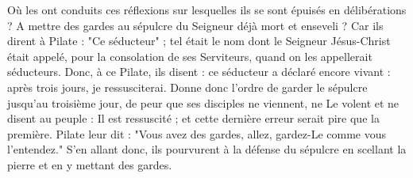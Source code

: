  Où les ont conduits ces réflexions sur lesquelles ils se sont épuisés en délibérations ? A mettre des gardes au sépulcre du Seigneur déjà mort et enseveli ? Car ils dirent à Pilate : "Ce séducteur" ; tel était le nom dont le Seigneur Jésus-Christ était appelé, pour la consolation de ses Serviteurs, quand on les appellerait séducteurs. Donc, à ce Pilate, ils disent : ce séducteur a déclaré encore vivant : après trois jours, je ressusciterai. Donne donc l'ordre de garder le sépulcre jusqu'au troisième jour, de peur que ses disciples ne viennent, ne Le volent et ne disent au peuple : Il est ressuscité ; et cette dernière erreur serait pire que la première. Pilate leur dit : "Vous avez des gardes, allez, gardez-Le comme vous l'entendez." S'en allant donc, ils pourvurent à la défense du sépulcre en scellant la pierre et en y mettant des gardes.